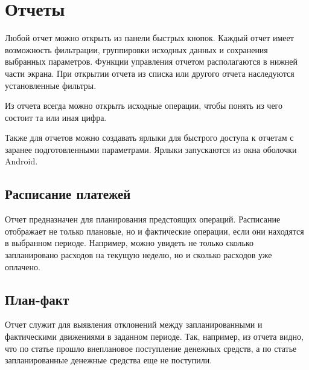 \documentclass[a4paper,10pt,russian]{sphinxmanual}
\begin{document}
\chapter{Отчеты}
\label{\detokenize{reports:chapter-reports}}\label{\detokenize{reports:id1}}\label{\detokenize{reports::doc}}
Любой отчет можно открыть из панели быстрых кнопок. Каждый отчет имеет возможность фильтрации,
группировки исходных данных и сохранения выбранных параметров. Функции
управления отчетом располагаются в нижней части экрана. При открытии отчета из списка или
другого отчета наследуются установленные фильтры.

\noindent{}
\noindent{}
\noindent{}
\noindent{}
\noindent{}

Из отчета всегда можно открыть исходные операции, чтобы понять из чего состоит та или иная цифра.

Также для отчетов можно создавать ярлыки для быстрого доступа к отчетам с заранее подготовленными параметрами.
Ярлыки запускаются из окна оболочки Android.


\section{Расписание платежей}
\label{\detokenize{reports:id2}}
Отчет предназначен для планирования предстоящих операций. Расписание отображает не только плановые, но и фактические
операции, если они находятся в выбранном периоде. Например, можно увидеть не только сколько запланировано расходов
на текущую неделю, но и сколько расходов уже оплачено.

\noindent{}
\noindent{}
\noindent{}


\section{План-факт}
\label{\detokenize{reports:id3}}
Отчет служит для выявления отклонений между запланированными и фактическими движениями в заданном периоде. Так, например,
из отчета видно, что по статье  прошло внеплановое поступление денежных средств,
а по статье 
запланированные денежные средства еще не поступили.
\end{document}
